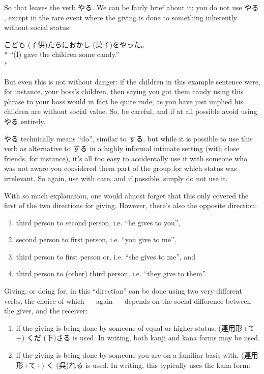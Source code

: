 \documentclass[11pt, b5paper, twoside, openright, onecolumn]{book}
\makeatletter
\newcommand*{\rubystack}[2]{{\relscale{0.5}%
  \begin{tabular}[b]{@{}c@{}}%
    {#1}\\%
   {\textscale{2}{#2}}%
  \end{tabular}}%
}
\DeclareRobustCommand*{\ruby}[2]{%
  \mbox{%
    \setlength{\parskip}{0ex}%
    \BeginAccSupp{method=pdfstringdef,ActualText={#1}}%
      \rubystack{\phantom{#2}}{#1}%
      \llap{%
        \rubystack{#2}{\phantom{#1}}%
      }%
    \EndAccSupp{}%
  }%
}
\renewcommand*{\ruby}[2]{#2 (#1)}%
\newenvironment{exampleblock}{
\setlength{\parindent}{0.6in}
\begin{minipage}[t]{\dimexpr\textwidth-\parindent}}
{\end{minipage}}
\makeatother
\begin{document}
So that leaves the verb やる. We can be fairly brief about it: you do not use やる‚ except in the rare event where the giving is done to something inherently without social status:

\vspace{0.4cm}
\begin{exampleblock}
\ruby{子供}{こども}たちにお\ruby{菓子}{かし}をやった。 \\* 
“(I) gave the children some candy.” \\* 
\end{exampleblock}
\vspace{0.2cm}

But even this is not without danger: if the children in this example sentence were‚ for instance‚ your boss’s children‚ then saying you got them candy using this phrase to your boss would in fact be quite rude‚ as you have just implied his children are without social value. So‚ be careful‚ and if at all possible avoid using やる entirely.

やる technically means “do”‚ similar to する‚ but while it is possible to use this verb as alternative to する in a highly informal intimate setting (with close friends‚ for instance)‚ it’s all too easy to accidentally use it with someone who was not aware you considered them part of the group for which status was irrelevant. So again‚ use with care‚ and if possible‚ simply do not use it.

With so much explanation‚ one would almost forget that this only covered the first of the two directions for giving. However‚ there’s also the opposite direction:

\begin{enumerate}
\item third person to second person‚ i.e. “he gives to you”‚
\item second person to first person‚ i.e. “you give to me”‚
\item third person to first person or‚ i.e. “she gives to me”‚ and
\item third person to (other) third person‚ i.e. “they give to them”.
\end{enumerate}

Giving‚ or doing for‚ in this “direction” can be done using two very different verbs‚ the choice of which — again — depends on the social difference between the giver‚ and the receiver:

\begin{enumerate}
\item if the giving is being done by someone of equal or higher status‚ (連用形+て+) \ruby{下}{くだ}さる is used. In writing‚ both kanji and kana forms may be used.
\item if the giving is being done by someone you are on a familiar basis with‚ (連用形+て+) \ruby{呉}{く}れる is used. In writing‚ this typically uses the kana form.
\end{enumerate}
\end{document}
